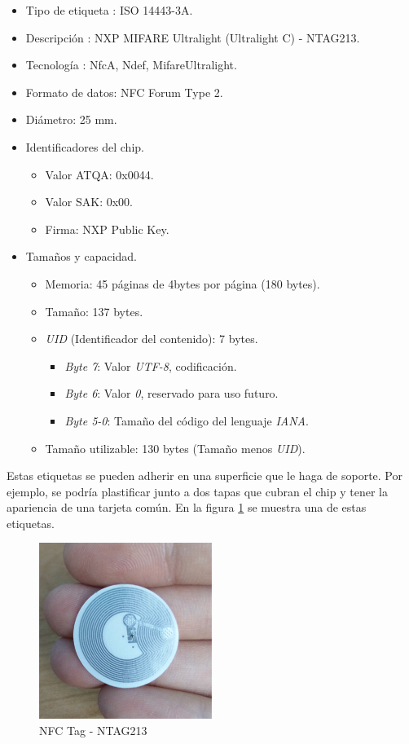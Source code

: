 \documentclass[../PFC.tex]{subfiles}
\begin{document}
\begin{itemize}
\item{Tipo de etiqueta : ISO 14443-3A.}
\item{Descripción : NXP MIFARE Ultralight (Ultralight C) - NTAG213.}
\item{Tecnología : NfcA, Ndef, MifareUltralight.}
\item{Formato de datos: NFC Forum Type 2.}
\item{Diámetro: 25 mm.}
\item{Identificadores del chip.}
	\begin{itemize}
	\item{Valor ATQA: 0x0044.}
	\item{Valor SAK: 0x00.}
	\item{Firma: NXP Public Key.}
	\end{itemize}
\item{Tamaños y capacidad.}
	\begin{itemize}
	\item{Memoria: 45 páginas de 4bytes por página (180 bytes).}
	\item{Tamaño: 137 bytes.}
	\item{\textit{UID} (Identificador del contenido): 7 bytes\cite{nfcSpecifications}.}
		\begin{itemize}
		\item{\textit{Byte 7}: Valor \textit{UTF-8}, codificación.}
		\item{\textit{Byte 6}: Valor \textit{0}, reservado para uso futuro.}
		\item{\textit{Byte 5-0}: Tamaño del código del lenguaje \textit{IANA}.}
		\end{itemize}	
	\item{Tamaño utilizable: 130 bytes (Tamaño menos \textit{UID}).}	
	\end{itemize}
\end{itemize}

Estas etiquetas se pueden adherir en una superficie que le haga de soporte. Por ejemplo, se podría plastificar junto a dos tapas que cubran el chip y tener la apariencia de una tarjeta común. En la figura \ref{img:nfctag} se muestra una de estas etiquetas. 

\begin{figure}[H]
  \centering
  \includegraphics[width=0.5\textwidth]{./img/nfctag}
  \caption{NFC Tag - NTAG213}
  \label{img:nfctag}
\end{figure}
\end{document}

